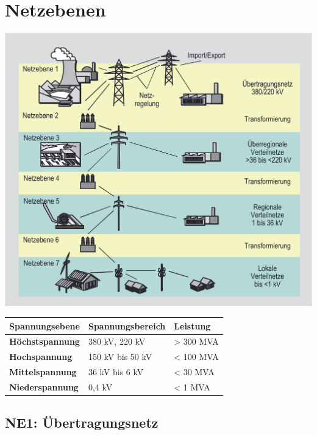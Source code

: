 \section{Netzebenen}

\begin{center}
    \includegraphics[width=0.95\columnwidth, align=c]{images/Netzebenen_1.png}
\end{center}

\begin{tabular}{>{\bfseries}l l l}
    \toprule
    Spannungsebene & Spannungsbereich & Leistung \\
    \midrule
    Höchstspannung   & 380 kV, 220 kV         & > 300 MVA \\
    Hochspannung     & 150 kV bis 50 kV       & < 100 MVA \\
    Mittelspannung   & 36 kV bis 6 kV         & < 30 MVA \\
    Niederspannung   & 0{,}4 kV               & < 1 MVA \\
    \bottomrule
\end{tabular}

\subsection{NE1: Übertragungsnetz}

